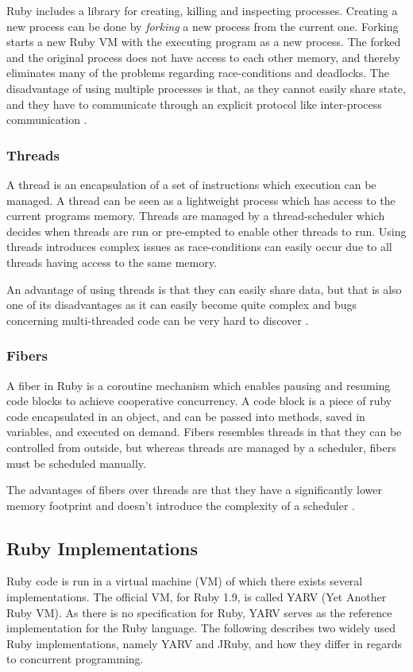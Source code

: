 Ruby includes a library for creating, killing and inspecting processes.
Creating a new process can be done by \textit{forking} a new process from the
current one. Forking starts a new Ruby VM with the executing program as a new
process. The forked and the original process does not have access to each
other memory, and thereby eliminates many of the problems regarding
race-conditions and deadlocks. The disadvantage of using multiple processes is
that, as they cannot easily share state, and they have to communicate through an explicit
protocol like inter-process communication \cite{ruby19}.

\subsubsection{Threads}
A thread is an encapsulation of a set of instructions which execution can
be managed. A thread can be seen as a lightweight process which has access to
the current programs memory. Threads are managed by a thread-scheduler which
decides when threads are run or pre-empted to enable other threads to
run. Using threads introduces complex issues as race-conditions can easily
occur due to all threads having access to the same memory.

An advantage of using threads is that they can easily share data, but that
is also one of its disadvantages as it can easily become quite complex and
bugs concerning multi-threaded code can be very hard to discover
\cite{ruby19}.

\subsubsection{Fibers}
A fiber in Ruby is a coroutine mechanism which enables pausing and resuming
code blocks to achieve cooperative concurrency. A code block is a
piece of ruby code encapsulated in an object, and can be passed into
methods, saved in variables, and executed on demand. Fibers resembles threads in
that they can be controlled from outside, but whereas threads are managed by a
scheduler, fibers must be scheduled manually.

The advantages of fibers over threads are that they have a significantly lower
memory footprint and doesn't introduce the complexity of a scheduler \cite{rubyfiber}.

\subsection{Ruby Implementations}
Ruby code is run in a virtual machine (VM) of which there exists several
implementations. The official VM, for Ruby 1.9, is called YARV (Yet
Another Ruby VM). As there is no specification for Ruby, YARV serves as
the reference implementation for the Ruby language. The following describes
two widely used Ruby implementations, namely YARV and JRuby, and how they
differ in regards to concurrent programming.

